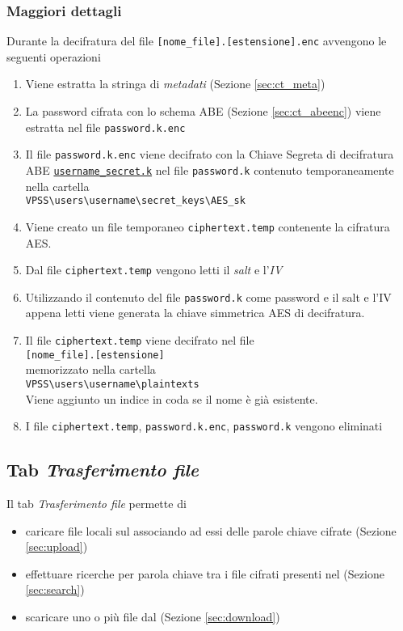 \documentclass[a4paper,twoside,10pt,openany]{scrbook}
\begin{document}
\subsubsection*{Maggiori dettagli}
%
Durante la decifratura del file \texttt{[nome\_file].[estensione].enc} avvengono le seguenti operazioni
\begin{enumerate}
 \item Viene estratta la stringa di \emph{metadati} (Sezione \ref{sec:ct_meta})
 \item La password cifrata con lo schema ABE (Sezione \ref{sec:ct_abeenc}) viene estratta nel file \texttt{password.k.enc}
 \item Il file \texttt{password.k.enc} viene decifrato con la Chiave Segreta di decifratura ABE \texttt{\hyperref[sec:format_sk]{username\_secret.k}} nel file \texttt{password.k} contenuto temporaneamente nella cartella \\
 \texttt{VPSS\textbackslash users\textbackslash username\textbackslash secret\_keys\textbackslash AES\_sk} 
 \item Viene creato un file temporaneo \texttt{ciphertext.temp} contenente la cifratura AES.
 \item Dal file \texttt{ciphertext.temp} vengono letti il \emph{salt} e l'\emph{IV}
 \item Utilizzando il contenuto del file  \texttt{password.k} come password e il salt e l'IV appena letti viene generata la chiave simmetrica AES di decifratura.
 \item Il file \texttt{ciphertext.temp} viene decifrato nel file\\
       \texttt{[nome\_file].[estensione]}\\
       memorizzato nella cartella\\
       \texttt{VPSS\textbackslash users\textbackslash username\textbackslash plaintexts}\\
       Viene aggiunto un indice in coda se il nome è già esistente.
 \item I file \texttt{ciphertext.temp}, \texttt{password.k.enc}, \texttt{password.k} vengono eliminati
\end{enumerate}
%
\subsection{Tab \emph{Trasferimento file}}\label{sec:tab_trasferimento}
%
Il tab \emph{Trasferimento file} permette di
\begin{itemize}
 \item caricare file locali sul \sa associando ad essi delle parole chiave cifrate (Sezione \ref{sec:upload})
 \item effettuare ricerche per parola chiave tra i file cifrati presenti nel \sa (Sezione \ref{sec:search})
 \item scaricare uno o più file dal \sa (Sezione \ref{sec:download})
\end{itemize}
%
\end{document}
